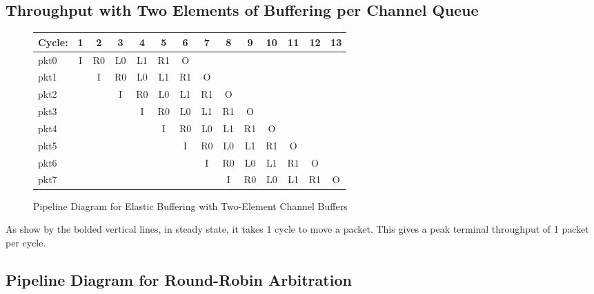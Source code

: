 \documentclass[10pt]{article}
\begin{document}
\subsection{Throughput with Two Elements of Buffering per Channel Queue}

\begin{figure}[H]
\centering
{\setlength{\tabcolsep}{2pt}
\begin{tabular}{|l|c|c|c|c|c|c|c|c|c!{\vrule width 1.5pt}c!{\vrule width 1.5pt}c!{\vrule width 1.5pt}c!{\vrule width 1.5pt}c|}
\hline
Cycle: & 1  & 2  & 3  & 4  & 5  & 6  & 7  & 8  & 9  & 10 & 11 & 12 & 13 \\ \hline
pkt0   & I  & R0 & L0 & L1 & R1 & O  &    &    &    &    &    &    &    \\ \hline
pkt1   &    & I  & R0 & L0 & L1 & R1 & O  &    &    &    &    &    &    \\ \hline
pkt2   &    &    & I  & R0 & L0 & L1 & R1 & O  &    &    &    &    &    \\ \hline
pkt3   &    &    &    & I  & R0 & L0 & L1 & R1 & O  &    &    &    &    \\ \hline
pkt4   &    &    &    &    & I  & R0 & L0 & L1 & R1 & O  &    &    &    \\ \hline
pkt5   &    &    &    &    &    & I  & R0 & L0 & L1 & R1 & O  &    &    \\ \hline
pkt6   &    &    &    &    &    &    & I  & R0 & L0 & L1 & R1 & O  &    \\ \hline
pkt7   &    &    &    &    &    &    &    & I  & R0 & L0 & L1 & R1 & O  \\ \hline
\end{tabular}
}
\caption{Pipeline Diagram for Elastic Buffering with Two-Element Channel Buffers}
\end{figure}
As show by the bolded vertical lines, in steady state, it takes 1 cycle to move a packet. This gives a peak terminal throughput of 1 packet per cycle.

\subsection{Pipeline Diagram for Round-Robin Arbitration}
\end{document}
